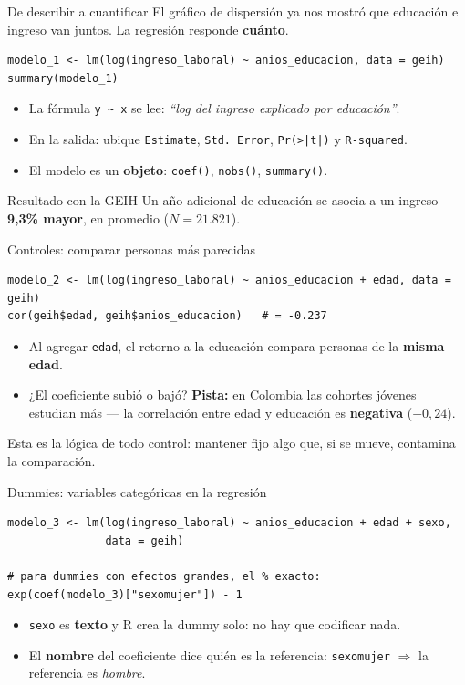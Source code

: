 \documentclass[10pt]{beamer}
\begin{document}
\begin{frame}[fragile]{De describir a cuantificar}
  El gráfico de dispersión ya nos mostró que educación e ingreso van juntos.
  La regresión responde \textbf{cuánto}.
\begin{lstlisting}
modelo_1 <- lm(log(ingreso_laboral) ~ anios_educacion, data = geih)
summary(modelo_1)
\end{lstlisting}
  \begin{itemize}
    \item La fórmula \texttt{y \textasciitilde{} x} se lee: \emph{``log del ingreso explicado por educación''}.
    \item En la salida: ubique \texttt{Estimate}, \texttt{Std. Error}, \texttt{Pr(>|t|)} y \texttt{R-squared}.
    \item El modelo es un \textbf{objeto}: \texttt{coef()}, \texttt{nobs()}, \texttt{summary()}.
  \end{itemize}
  \medskip
  \begin{block}{Resultado con la GEIH}
    Un año adicional de educación se asocia a un ingreso \textbf{9,3\% mayor}, en promedio ($N = 21.821$).
  \end{block}
\end{frame}

\begin{frame}[fragile]{Controles: comparar personas más parecidas}
\begin{lstlisting}
modelo_2 <- lm(log(ingreso_laboral) ~ anios_educacion + edad, data = geih)
cor(geih$edad, geih$anios_educacion)   # = -0.237
\end{lstlisting}
  \begin{itemize}\setlength\itemsep{0.5em}
    \item Al agregar \texttt{edad}, el retorno a la educación compara personas de la \textbf{misma edad}.
    \item ¿El coeficiente subió o bajó? \textbf{Pista:} en Colombia las cohortes jóvenes estudian más --- la correlación entre edad y educación es \textbf{negativa} ($-0{,}24$).
  \end{itemize}
  \medskip
  \small Esta es la lógica de todo control: mantener fijo algo que, si se mueve, contamina la comparación.
\end{frame}

\begin{frame}[fragile]{Dummies: variables categóricas en la regresión}
\begin{lstlisting}
modelo_3 <- lm(log(ingreso_laboral) ~ anios_educacion + edad + sexo,
               data = geih)

# para dummies con efectos grandes, el % exacto:
exp(coef(modelo_3)["sexomujer"]) - 1
\end{lstlisting}
  \begin{itemize}
    \item \texttt{sexo} es \textbf{texto} y R crea la dummy solo: no hay que codificar nada.
    \item El \textbf{nombre} del coeficiente dice quién es la referencia: \texttt{sexomujer} $\Rightarrow$ la referencia es \emph{hombre}.
  \end{itemize}
\end{frame}
\end{document}
